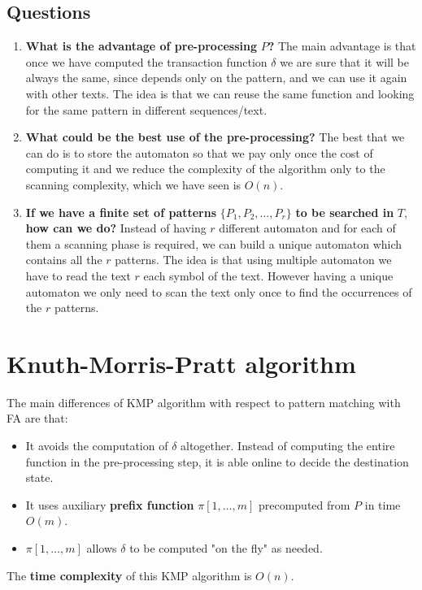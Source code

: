 \subsection{Questions}
\begin{enumerate}
	\item \textbf{What is the advantage of pre-processing} $P$\textbf{?} The main advantage is that once we have computed the transaction function $\delta$ we are sure that it will be always the same, since depends only on the pattern, and we can use it again with other texts. The idea is that we can reuse the same function and looking for the same pattern in different sequences/text.
	\item \textbf{What could be the best use of the pre-processing?} The best that we can do is to store the automaton so that we pay only once the cost of computing it and we reduce the complexity of the algorithm only to the scanning complexity, which we have seen is $O(n)$.
	\item \textbf{If we have a finite set of patterns} $\{P_1, P_2, \dots, P_r	\}$ \textbf{to be searched in} $T$, \textbf{how can we do?} Instead of having $r$ different automaton and for each of them a scanning phase is required, we can build a unique automaton which contains all the $r$ patterns. The idea is that using multiple automaton we have to read the text $r$ each symbol of the text. However having a unique automaton we only need to scan the text only once to find the occurrences of the $r$ patterns.
\end{enumerate}

\section{Knuth-Morris-Pratt algorithm}
The main differences of KMP algorithm with respect to pattern matching with FA are that:
\begin{itemize}
	\item It avoids the computation of $\delta$ altogether. Instead of computing the entire function in the pre-processing step, it is able online to decide the destination state.
	\item It uses auxiliary \textbf{prefix function} $\pi[1, \dots, m]$ precomputed from $P$ in time $O(m)$.
	\item $\pi[1, \dots, m]$ allows $\delta$ to be computed "on the fly" as needed.
\end{itemize}
The \textbf{time complexity} of this KMP algorithm is $O(n)$.

